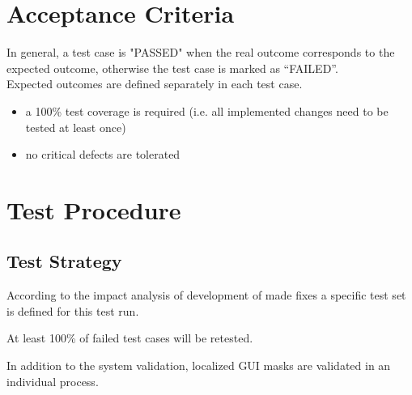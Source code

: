 \documentclass{article}
\begin{document}
\section{Acceptance Criteria}
In general, a test case is "PASSED" when the real outcome corresponds to the expected outcome, otherwise the test case is marked as “FAILED”.\\ Expected outcomes are defined separately in each test case.
\begin{itemize}
\item	a 100\% test coverage is required (i.e. all implemented changes need to be tested at least once)
\item	no critical defects are tolerated 
\end{itemize}

\section{Test Procedure}

\subsection{Test Strategy}
\item According to the impact analysis of development of made fixes a specific test set is defined for this test run.
\item At least 100\% of failed test cases will be retested.\\

\item In addition to the system validation, localized GUI masks are validated in an individual process.
\end{document}

